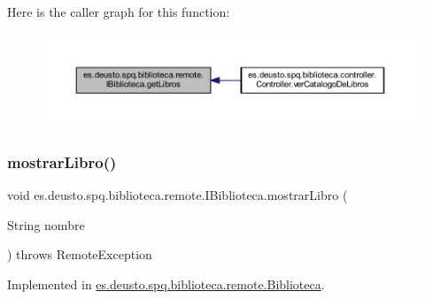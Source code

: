 Here is the caller graph for this function\+:
\nopagebreak
\begin{figure}[H]
\begin{center}
\leavevmode
\includegraphics[width=350pt]{interfacees_1_1deusto_1_1spq_1_1biblioteca_1_1remote_1_1_i_biblioteca_a84e7d607d76ccc999d384d967987ebd8_icgraph}
\end{center}
\end{figure}
\mbox{\label{interfacees_1_1deusto_1_1spq_1_1biblioteca_1_1remote_1_1_i_biblioteca_a9a4d21325f41bc582e7e792e0ae40857}} 
\subsubsection{\texorpdfstring{mostrar\+Libro()}{mostrarLibro()}}
{\footnotesize\ttfamily void es.\+deusto.\+spq.\+biblioteca.\+remote.\+I\+Biblioteca.\+mostrar\+Libro (\begin{DoxyParamCaption}\item[{String}]{nombre }\end{DoxyParamCaption}) throws Remote\+Exception}



Implemented in \mbox{\hyperlink{classes_1_1deusto_1_1spq_1_1biblioteca_1_1remote_1_1_biblioteca_a6455f223a57806146e77149429caf6db}{es.\+deusto.\+spq.\+biblioteca.\+remote.\+Biblioteca}}.

